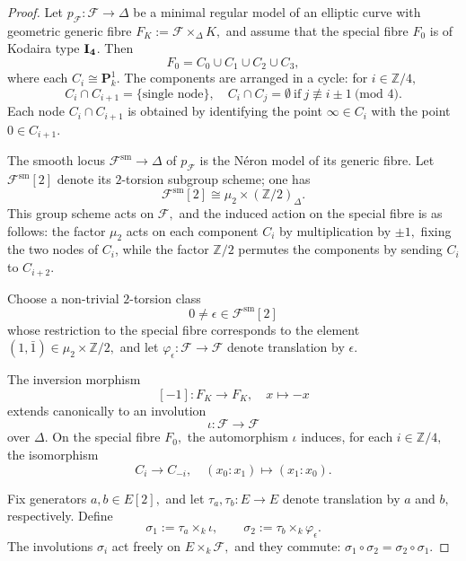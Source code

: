 \documentclass[11pt,letterpaper]{amsart}
\newcommand{\ca}[1]{{\mathcal{#1}}}
\numberwithin{equation}{section}
\theoremstyle{definition}
\theoremstyle{remark}
\newcommand{\Z}{\mathbb{Z}}
\newcommand{\bbP}{\mathbf{P}}
\begin{document}
\begin{proof} Let $p_{\mathcal{F}}\colon\mathcal{F}\to\Delta$ be a minimal regular model of an elliptic curve with geometric generic fibre $F_{K}:=\mathcal{F}\times_{\Delta}K,$ and assume that the special fibre $F_{0}$ is of Kodaira type $\bf{I}_{4}$. Then $$F_{0}=C_{0}\cup C_{1}\cup C_{2}\cup C_{3},$$ where each $C_{i}\cong\bbP^{1}_{k}$. The components are arranged in a cycle: for $i\in\Z/4,$ $$C_{i}\cap C_{i+1}=\{\text{single node}\}, \quad C_{i}\cap C_{j}=\emptyset\ \text{if}\ j\not\equiv i\pm 1\ \text{(mod 4)}.$$
Each node $C_{i}\cap C_{i+1}$ is obtained by identifying the point $\infty\in C_{i}$ with the point $0\in C_{i+1}$.\par
The smooth locus $\mathcal{F}^{\mathrm{sm}}\to\Delta$ of $p_{\mathcal{F}}$ is the N\'eron model of its generic fibre. Let $\mathcal{F}^{\mathrm{sm}}[2]$ denote its $2$-torsion subgroup scheme; one has $$\mathcal{F}^{\mathrm{sm}}[2]\cong\mu_{2}\times(\Z/2)_{\Delta}.$$ This group scheme acts on $\mathcal{F},$ and the induced action on the special fibre is as follows: the factor $\mu_{2}$ acts on each component $C_{i}$ by multiplication by $\pm1,$ fixing the two nodes of $C_{i}$, while the factor $\Z/2$ permutes the components by sending $C_{i}$ to $C_{i+2}$.\par
Choose a non-trivial $2$-torsion class $$0\neq\epsilon\in\mathcal{F}^{\mathrm{sm}}[2]$$ whose restriction to the special fibre corresponds to the element $(1,\bar{1})\in\mu_{2}\times\Z/2,$ and let $\varphi_{\epsilon}\colon \ca F\longrightarrow\ca F$ denote translation by $\epsilon$.\par
The inversion morphism $$[-1]\colon F_{K}\longrightarrow F_{K},\quad x\longmapsto -x$$ extends canonically to an involution
\begin{equation*}
    \iota\colon \ca F\longrightarrow\ca F
\end{equation*}
over $\Delta$. On the special fibre $F_0,$ the automorphism $\iota$ induces, for each $i\in\Z/4,$ the isomorphism $$C_i\longrightarrow C_{-i},\quad (x_{0}:x_{1})\longmapsto (x_{1}:x_{0}).$$\par
Fix generators $a,b\in E[2],$ and let $\tau_{a},\tau_{b}\colon E\to E$ denote translation by $a$ and $b,$ respectively. Define
\begin{equation}\label{eq:inv_bielliptic}
    \sigma_{1}:=\tau_{a}\times_{k}\iota, \qquad 
    \sigma_{2}:=\tau_{b}\times_{k}\varphi_{\epsilon}.
\end{equation}
The involutions $\sigma_{i}$ act freely on $E\times_{k}\ca F,$ and they commute: $\sigma_{1}\circ\sigma_{2}=\sigma_{2}\circ\sigma_{1}$.\par

\end{proof}
\end{document}
